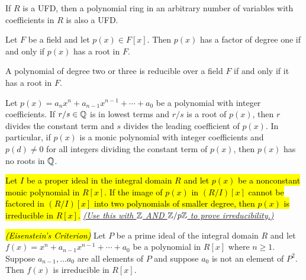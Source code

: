 \nl

\begin{cor}
If $R$ is a UFD, then a polynomial ring in an arbitrary number of variables with coefficients in $R$ is also a UFD.
\end{cor}

\nl

\begin{prop}
Let $F$ be a field and let $p(x)\in F[x]$. Then $p(x)$ has a factor of degree one if and only if $p(x)$ has a root in $F$.
\end{prop}

\nl

\begin{prop}
A polynomial of degree two or three is reducible over a field $F$ if and only if it has a root in $F$.
\end{prop}

\nl

\begin{prop}
Let $p(x) = a_nx^n+ a_{n-1}x^{n-1} + \cdots +a_0$ be a polynomial with integer coefficients. If $r/s\in \mathbb{Q}$ is in lowest terms and $r/s$ is a root of $p(x)$, then $r$ divides the constant term and $s$ divides the leading coefficient of $p(x)$. In particular, if $p(x)$ is a monic polynomial with integer coefficients and $p(d) \neq 0$ for all integers dividing the constant term of $p(x)$, then $p(x)$ has no roots in $\mathbb{Q}$.
\end{prop}

\nl

\begin{prop}
\hl{Let $I$ be a proper ideal in the integral domain $R$ and let $p(x)$ be a nonconstant monic polynomial in $R[x]$. If the image of $p(x)$ in $(R/I)[x]$ cannot be factored in $(R/I)[x]$ into two polynomials of smaller degree, then $p(x)$ is irreducible in $R[x]$.} \underline{\textit{(Use this with $\mathbb{Z}$ AND $\mathbb{Z}/p\mathbb{Z}$ to prove irreducibility.)}}
\end{prop} 

\nl

\begin{prop}\hl{\textit{(Eisenstein's Criterion)}}
Let $P$ be a prime ideal of the integral domain $R$ and let $f(x) = x^n + a_{n-1}x^{n-1}+\cdots + a_0$ be a polynomial in $R[x]$ where $n\geq 1$. Suppose $a_{n-1}, \ldots a_0$ are all elements of $P$ and suppose $a_0$ is not an element of $P^2$. Then $f(x)$ is irreducible in $R[x]$.
\end{prop}

\nl

